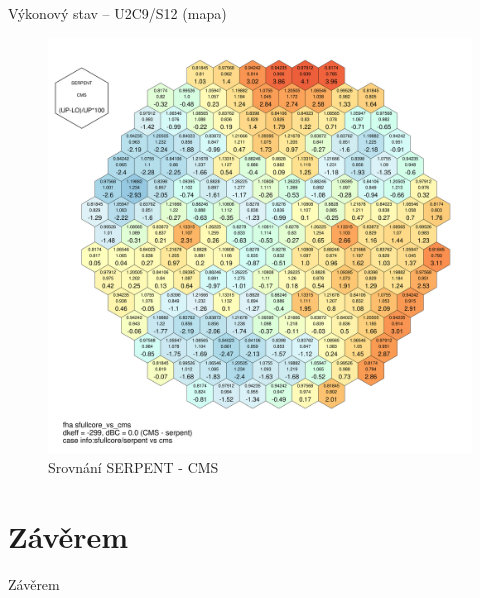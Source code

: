 \documentclass{beamer}
\begin{document}
\begin{frame}{Výkonový stav -- U2C9/S12 (mapa)}
\begin{figure}[!h]
	\centering
	\includegraphics[scale=0.08]{img/fha_sfullcore_vs_cms.pdf}
	\caption{Srovnání SERPENT - CMS}
\end{figure}
\end{frame}



\section{Závěrem}

\begin{frame}{Závěrem}


\end{frame}
\end{document}
